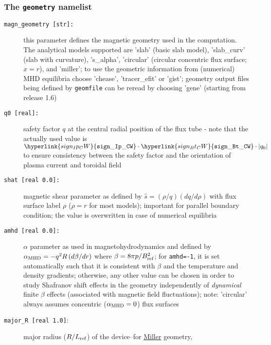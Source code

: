 \documentclass[12pt]{article}
\begin{document}
\subsubsection{The \texttt{geometry} namelist}
\hypertarget{geometry_nml}{}
\begin{description}
\item[\hypertarget{magn_geometry}{\tt magn\_geometry [str]:}] this parameter defines the magnetic geometry used in the computation.
  The analytical models supported are 'slab' (basic slab model), 'slab\_curv' (slab with curvature),
  's\_alpha', 'circular' (circular concentric flux surface; $x = r$), and 'miller';
  to use the geometric information from
  (numerical) MHD equilibria choose 'chease', 'tracer\_efit' or 'gist';
  \gene geometry output files being defined by \texttt{geomfile} can be reread
  by choosing 'gene' (starting from release 1.6)
%
%
\item[{\parbox[t]{0.9\linewidth}{additional parameters for analytical equilibrium models\\
 's\_alpha', 'circular', and 'miller':}}]
\item[\hypertarget{q0}{\texttt{q0 [real]:}}] safety factor $q$ at the central radial position of the flux tube - note that the actually used value is $\hyperlink{sign_Ip_CW}{\tt sign\_Ip\_CW}\cdot\hyperlink{sign_Bt_CW}{\tt sign\_Bt\_CW}\cdot|q_0|$ to ensure consistency between the safety factor and the orientation of plasma current and toroidal field
\item[\texttt{shat [real 0.0]:}] magnetic shear parameter as defined by $\hat s=(\rho/q)(dq/d\rho)$ with flux surface label $\rho$
 ($\rho = r$ for most models); important for parallel boundary condition; the value is overwritten in case of numerical equilibria
\item[\texttt{amhd [real 0.0]:}] $\alpha$ parameter as used in magnetohydrodynamics and defined by
  $\alpha_{\rm MHD}=-q^2R\,(d\beta/dr)$ where $\beta=8\pi p/B_{\rm ref}^2$; for \texttt{amhd=-1}, it is set automatically
  such that it is consistent with $\beta$ and the temperature and density gradients; otherwise, any
  other value can be chosen in order to study Shafranov shift effects in the geometry independently of
  {\em dynamical} finite $\beta$ effects (associated with magnetic field fluctuations); note: 'circular' always assumes
  concentric ($\alpha_{\rm MHD} = 0$) flux surfaces
\item[\hypertarget{major_R}{\texttt{major\_R [real 1.0]}}:] major radius ($R/L_{\rm ref}$) of the device--for \hyperlink{desc:miller}{Miller} geometry,

\end{description}
\end{document}
